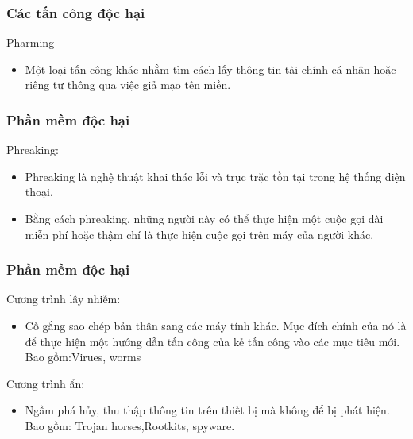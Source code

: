 \documentclass{beamer}
\begin{document}
\begin{frame}
\frametitle{Các tấn công độc hại}
    \begin{block}{Pharming}
         \begin{itemize}
    \item Một loại tấn công khác nhằm tìm cách lấy thông tin tài chính cá nhân hoặc riêng tư thông qua việc giả mạo tên miền. 
\end{itemize}
    \end{block}
\end{frame}
\begin{frame}
\frametitle{Phần mềm độc hại}
    \begin{block}{Phreaking:}
         \begin{itemize}
    \item Phreaking là nghệ thuật khai thác lỗi và trục trặc tồn tại trong hệ thống điện thoại.
    \item Bằng cách phreaking, những người này có thể thực hiện một cuộc gọi dài miễn phí hoặc thậm chí là thực hiện cuộc gọi trên máy của người khác.
\end{itemize}
    \end{block}
\end{frame}


\begin{frame}
\frametitle{Phần mềm độc hại}
    \begin{block}{Cương trình lây nhiễm:}
         \begin{itemize}
    \item Cố gắng sao chép bản thân sang các máy tính khác. Mục đích chính của nó là để thực hiện một hướng dẫn tấn công của kẻ tấn công vào các mục tiêu mới. Bao gồm:Virues, worms
        \end{itemize}
    \end{block}
    \begin{block}{Cương trình ẩn:}
         \begin{itemize}
    \item Ngầm phá hủy, thu thập thông tin trên thiết bị mà không để bị phát hiện. Bao gồm: Trojan horses,Rootkits, spyware.
        \end{itemize}
    \end{block}
\end{frame}


\end{document}
